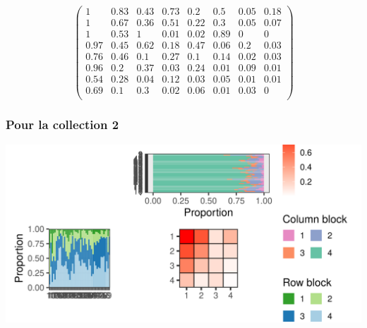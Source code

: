 \normalsize\newline\[\begin{pmatrix} 1 &0.83 &0.43 &0.73 &0.2 &0.5 &0.05 &0.18 \\1 &0.67 &0.36 &0.51 &0.22 &0.3 &0.05 &0.07 \\1 &0.53 &1 &0.01 &0.02 &0.89 &0 &0 \\0.97 &0.45 &0.62 &0.18 &0.47 &0.06 &0.2 &0.03 \\0.76 &0.46 &0.1 &0.27 &0.1 &0.14 &0.02 &0.03 \\0.96 &0.2 &0.37 &0.03 &0.24 &0.01 &0.09 &0.01 \\0.54 &0.28 &0.04 &0.12 &0.03 &0.05 &0.01 &0.01 \\0.69 &0.1 &0.3 &0.02 &0.06 &0.01 &0.03 &0 \\ \end{pmatrix}\]

\subsubsection{Pour la collection 2 }

\includegraphics{./img/2e1295ef8143b9413e953a4c0c2da20d962158f6.png}\newline \tiny


